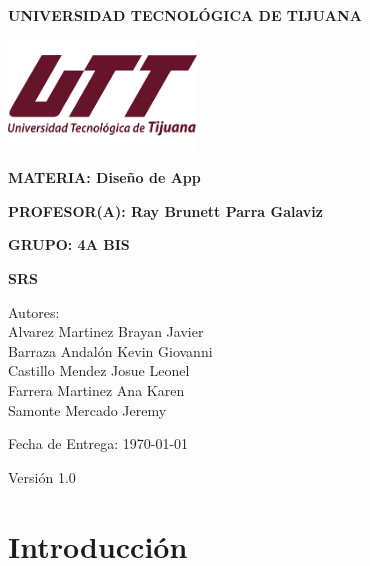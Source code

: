 \documentclass{article}
\begin{document}
\begin{titlepage}
    \centering
    \vspace*{1cm}
    
    \LARGE\textbf{UNIVERSIDAD TECNOLÓGICA DE TIJUANA}
    
    \includegraphics[width=5cm]{LOGO.jpeg}
    \vspace{0.5cm}
    
   \LARGE\textbf{MATERIA: Diseño de App}

    \vspace{0.5cm}

     \LARGE\textbf{PROFESOR(A): Ray Brunett Parra Galaviz }
    \vspace{0.5cm}
    
    \LARGE\textbf{GRUPO: 4A BIS }

    \LARGE\textbf{SRS}
    
   \vspace{0.5cm}

    \Large
    Autores: \\
    Alvarez Martinez Brayan Javier \\
    Barraza Andalón Kevin Giovanni\\
    Castillo Mendez Josue Leonel \\
    Farrera Martinez Ana Karen\\
    Samonte Mercado Jeremy\\
    
    
    \vspace{1cm}
    
    \large
    Fecha de Entrega:  \today
    
    \vfill
    
    \begin{flushright}
        Versión 1.0
    \end{flushright}
\end{titlepage}

\section{Introducción}
\end{document}
